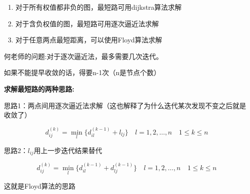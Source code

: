 \documentclass[12pt, a4paper, oneside, UTF8]{ctexbook}
\begin{document}
\begin{enumerate}
    \item 对于所有权值都非负的图，最短路可用dijkstra算法求解
    \item 对于含负权值的图，最短路可用逐次逼近法求解
    \item 对于任意两点最短距离，可以使用Floyd算法求解
\end{enumerate}

何老师的问题:对于逐次逼近法，最多需要几次迭代。

如果不能提早收敛的话，得要n-1次（n是节点个数）

\textbf{求解最短路的两种思路:}

思路1：两点间用逐次逼近法求解（这也解释了为什么迭代某次发现不变之后就是收敛了）

\[ d_{ij}^{(k)} = \min_{l} \{ d_{il}^{(k-1)} + l_{lj} \} \quad l=1,2,\ldots,n \quad 1 \leq k \leq n \]

思路2：\( l_{ij} \)用上一步迭代结果替代

\[ d_{ij}^{(k)} = \min_{l} \{ d_{il}^{(k-1)} + d_{lj}^{(k-1)} \} \quad l=1,2,\ldots,n \quad 1 \leq k \leq n \]

这就是Floyd算法的思路

\ifx\allfiles\undefined
\end{document}
